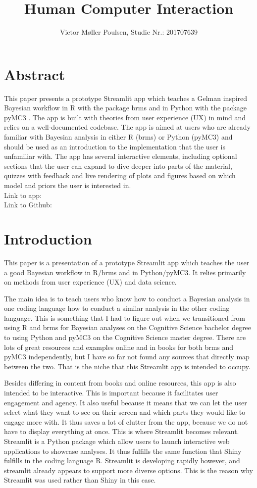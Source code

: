 \documentclass[12pt]{article}
\title{Human Computer Interaction}
\author{Victor Møller Poulsen, Studie Nr.: 201707639}
\begin{document}
\maketitle
\leavevmode

\section{Abstract}
This paper presents a prototype Streamlit app which teaches a Gelman
\autocite{gelman2020bayesian} inspired Bayesian workflow
in R with the package brms \autocite{Burkner2017} and in Python with the
package pyMC3 \autocite{Salvatier2016}. The app is built with theories from user
experience (UX) in mind and relies on a well-documented codebase. The app is
aimed at users who are already familiar with Bayesian analysis in either R
(brms) or Python (pyMC3) and should be used as an introduction to the
implementation that the user is unfamiliar with. The app has several
interactive elements, including optional sections that the user can expand to
dive deeper into parts of the material, quizzes with feedback and live
rendering of plots and figures based on which model and priors the user is
interested in.\\
Link to app: \\
Link to Github:

\section{Introduction}
This paper is a presentation of a prototype Streamlit app which teaches the user a
good Bayesian workflow in R/brms and in Python/pyMC3. It relies primarily on methods
from user experience (UX) and data science.

The main idea is to teach users who know how to conduct a Bayesian analysis in one coding
language how to conduct a similar analysis in the other coding language. This is something
that I had to figure out when we transitioned from using R and brms for Bayesian analyses
on the Cognitive Science bachelor degree to using Python and pyMC3 on the Cognitive Science
master degree. There are lots of great resources and examples online and in books for both
brms and pyMC3 independently, but I have so far not found any sources that directly map between
the two. That is the niche that this Streamlit app is intended to occupy.

Besides differing in content from books and online resources, this app is also intended
to be interactive. This is important because it facilitates user engagement and agency.
It also useful because it means that we can let the user select what they want to see on
their screen and which parts they would like to engage more with. It thus saves a lot of
clutter from the app, because we do not have to display everything at once.
This is where Streamlit becomes relevant. Streamlit is a Python package which allow users
to launch interactive web applications to showcase analyses. It thus fulfills the same function
that Shiny fulfills in the coding language R. Streamlit is developing rapidly however,
and streamlit already appears to support more diverse options. This is the reason why Streamlit
was used rather than Shiny in this case.
\end{document}
